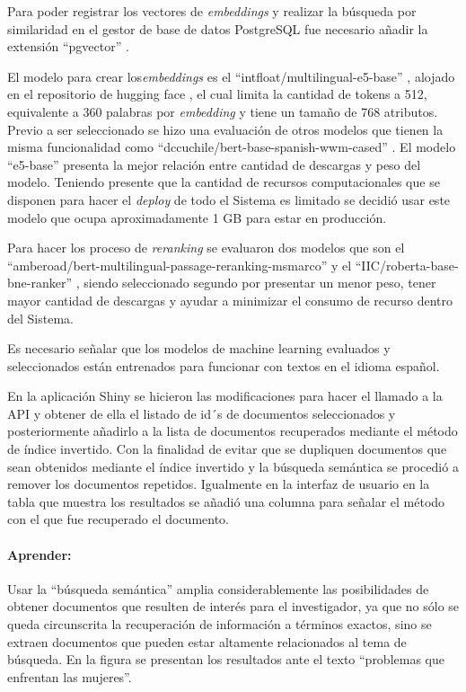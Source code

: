 \documentclass[
  12pt,
  openany]{book}
\begin{document}
Para poder registrar los vectores de \emph{embeddings} y realizar la búsqueda por similaridad en el gestor de base de datos PostgreSQL fue necesario añadir la extensión ``pgvector'' \citep{pgvector2023}.

El modelo para crear los\emph{embeddings} es el ``intfloat/multilingual-e5-base'' \citep{wang2022}, alojado en el repositorio de hugging face \citep{e5base}, el cual limita la cantidad de tokens a 512, equivalente a 360 palabras por \emph{embedding} y tiene un tamaño de 768 atributos. Previo a ser seleccionado se hizo una evaluación de otros modelos que tienen la misma funcionalidad como ``dccuchile/bert-base-spanish-wwm-cased'' \citep{canete2020}. El modelo ``e5-base'' presenta la mejor relación entre cantidad de descargas y peso del modelo. Teniendo presente que la cantidad de recursos computacionales que se disponen para hacer el \emph{deploy} de todo el Sistema es limitado se decidió usar este modelo que ocupa aproximadamente 1 GB para estar en producción.

Para hacer los proceso de \emph{reranking} se evaluaron dos modelos que son el ``amberoad/bert-multilingual-passage-reranking-msmarco'' \citep{erankingmsmarco} y el ``IIC/roberta-base-bne-ranker'' \citep{hfranker2023}, siendo seleccionado segundo por presentar un menor peso, tener mayor cantidad de descargas y ayudar a minimizar el consumo de recurso dentro del Sistema.

Es necesario señalar que los modelos de machine learning evaluados y seleccionados están entrenados para funcionar con textos en el idioma español.

En la aplicación Shiny se hicieron las modificaciones para hacer el llamado a la API y obtener de ella el listado de id´s de documentos seleccionados y posteriormente añadirlo a la lista de documentos recuperados mediante el método de índice invertido. Con la finalidad de evitar que se dupliquen documentos que sean obtenidos mediante el índice invertido y la búsqueda semántica se procedió a remover los documentos repetidos. Igualmente en la interfaz de usuario en la tabla que muestra los resultados se añadió una columna para señalar el método con el que fue recuperado el documento.

\hypertarget{semanapre}{%
\paragraph{Aprender:}\label{semanapre}}

Usar la ``búsqueda semántica'' amplia considerablemente las posibilidades de obtener documentos que resulten de interés para el investigador, ya que no sólo se queda circunscrita la recuperación de información a términos exactos, sino se extraen documentos que pueden estar altamente relacionados al tema de búsqueda. En la figura se presentan los resultados ante el texto ``problemas que enfrentan las mujeres''.
\end{document}
